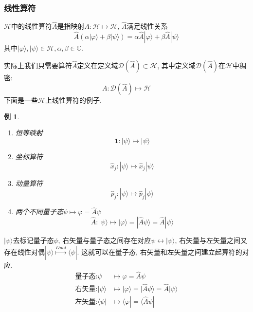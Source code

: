 \documentclass[a4paper,11pt]{article}
\theoremstyle{mystyle}
\newtheorem{example}{\hspace{2em}例}[section]
\begin{document}
\subsubsection{线性算符}
\begin{definition}[线性算符]
  $\mathcal{H}$中的线性算符$\hat{A}$是指映射$A:\mathcal{H}\longmapsto\mathcal{H}$, $\hat{A}$满足线性关系
\begin{equation*}
  \hat{A}(\alpha|\varphi\rangle+\beta|\psi\rangle)=\alpha \hat{A}|\varphi\rangle+\beta \hat{A}|\psi\rangle
\end{equation*}
其中$|\varphi\rangle, |\psi\rangle\in\mathcal{H},\alpha,\beta\in\mathbb{C}$.
\end{definition}
实际上我们只需要算符$\hat{A}$定义在定义域$\mathcal{D}(\hat{A})\subset\mathcal{H}$, 其中定义域$\mathcal{D}(\hat{A})$在$\mathcal{H}$中稠密:
\begin{equation*}
  A:\mathcal{D}(\hat{A})\longmapsto\mathcal{H}
\end{equation*}
下面是一些$\mathcal{H}$上线性算符的例子.
\begin{example}\quad
  \begin{enumerate}[1]
    \item 恒等映射
\begin{equation*}
  \mathbf{1}:|\psi\rangle\longmapsto|\psi\rangle
\end{equation*}
    \item 坐标算符
\begin{equation*}
  \hat{x}_j:|\psi\rangle\longmapsto \hat{x}_j|\psi\rangle
\end{equation*}
    \item 动量算符
\begin{equation*}
  \hat{p}_j:|\psi\rangle\longmapsto \hat{p}_j|\psi\rangle
\end{equation*}
    \item 两个不同量子态$\psi\longmapsto\varphi=\hat{A}\psi$
\begin{equation*}
  \hat{A}:|\psi\rangle\longmapsto|\varphi\rangle=|\hat{A}\psi\rangle=\hat{A}|\psi\rangle
\end{equation*}
  \end{enumerate}
\end{example}
$|\psi\rangle$去标记量子态$\psi$, 右矢量与量子态之间存在对应$\psi\longleftrightarrow|\psi\rangle$, 右矢量与左矢量之间又存在线性对偶$|\psi\rangle\stackrel{Dual}{\longmapsto}\langle\psi|$. 这就可以在量子态, 右矢量和左矢量之间建立起算符的对应.
\begin{equation*}
  \begin{split}
     \text{量子态:}\psi & \longmapsto\varphi=\hat{A}\psi \\
     \text{右矢量:}|\psi\rangle & \longmapsto|\varphi\rangle=|\hat{A}\psi\rangle=\hat{A}|\psi\rangle \\
     \text{左矢量:}\langle\psi| & \longmapsto\langle\varphi|=\langle\hat{A}\psi|
  \end{split}
\end{equation*}
\end{document}
